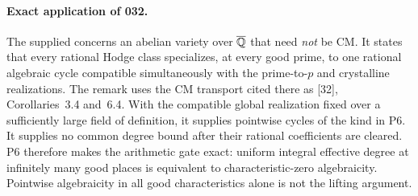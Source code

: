 \paragraph{Exact application of 032.}
The supplied \citet[Remark~8.5, printed pp.~50--51]{OpenAI26} concerns an abelian variety over $\overline{\mathbb Q}$ that need \emph{not} be CM. It states that every rational Hodge class specializes, at every good prime, to one rational algebraic cycle compatible simultaneously with the prime-to-$p$ and crystalline realizations. The remark uses the CM transport cited there as [32], Corollaries~3.4 and~6.4. With the compatible global realization fixed over a sufficiently large field of definition, it supplies pointwise cycles of the kind in P6. It supplies no common degree bound after their rational coefficients are cleared. P6 therefore makes the arithmetic gate exact: uniform integral effective degree at infinitely many good places is equivalent to characteristic-zero algebraicity. Pointwise algebraicity in all good characteristics alone is not the lifting argument.
